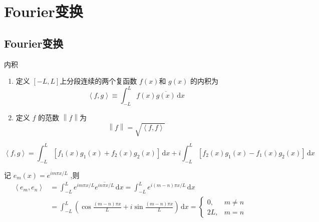 \documentclass[../../PDE.tex]{subfiles}
\begin{document}
\ifSubfilesClassLoaded{
    \frontmatter

    \tableofcontents
    
    \mainmatter
}{}

\chapter{Fourier变换}
\section{Fourier变换}
\begin{definition}{内积}
    \begin{enumerate}
        \item 定义 \(  \left[ -L,L \right]   \)上分段连续的两个复函数 \(  f\left( x \right)   \)和  \(  g\left( x \right)   \)  的内积为 \[
\left<f,g \right>\equiv  \int_{-L}^{L} f\left( x \right) \overline{g\left( x \right) }\,\mathrm{d} x 
\]
\item 定义 \(  f  \) 的范数 \(  \left\| f \right\|  \)为 \[
\left\| f \right\|= \sqrt{\left<f,f \right>}
\] 
    \end{enumerate}
    
\end{definition}
\begin{remark}
     \[
     \left<f,g \right>=   \int_{-L}^{L}\left[ f_1\left( x \right)g_1\left( x \right)+ f_2\left( x \right)g_2\left( x \right)     \right]\,\mathrm{d} x + i \int_{-L}^{L}\left[ f_2\left( x \right)g_1\left( x \right)-f_1\left( x \right)g_2\left( x \right)     \right]\,\mathrm{d} x 
     \]
\end{remark}

\begin{theorem}
    记 \(  e_{m}\left( x \right)= e^{im \pi x/L}   \) ,则 \[
  \begin{aligned}
  \left<e_{m},e_{n} \right>&=  \int_{-L}^{L}e^{im\pi  x /{L}} \overline{e^{in\pi x /L}} \,\mathrm{d} x = \int_{-L}^{L}e^{i\left( m-n \right) \pi  x/L }\,\mathrm{d} x\\ 
   &=  \int_{-L}^{L} \left( \cos \frac{\left( m-n \right)\pi x  }{ L} + i \sin \frac{\left( m-n \right)\pi x  }{L }  \right)\,\mathrm{d} x= \begin{cases} 0,&m\neq n\\ 
    2L,&m= n \end{cases}  
  \end{aligned}
    \]

\end{theorem}
\end{document}
